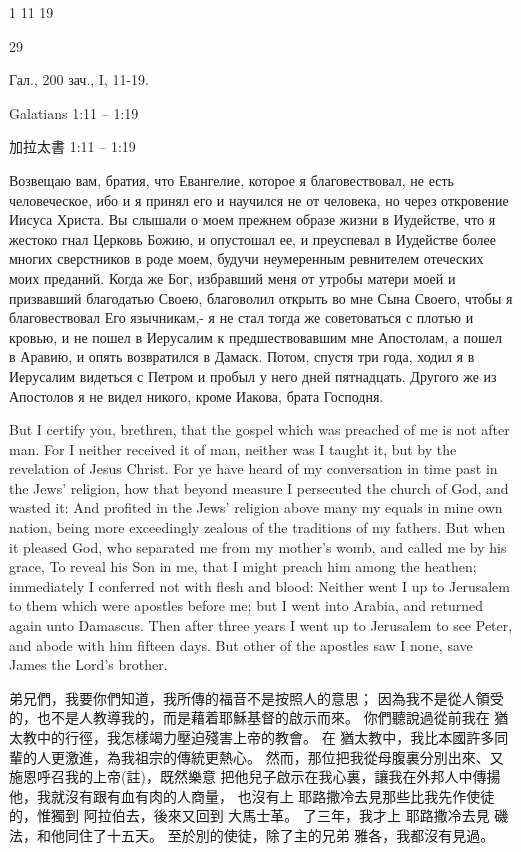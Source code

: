 1 11 19

29

\onehalfspacing %

\doublespacing %

\Large%

Гал., 200 зач., I, 11-19.

Galatians 1:11 -- 1:19

加拉太書 1:11 -- 1:19

Возвещаю вам, братия, что Евангелие, которое я благовествовал, не есть человеческое,
ибо и я принял его и научился не от человека, но через откровение Иисуса Христа.
Вы слышали о моем прежнем образе жизни в Иудействе, что я жестоко гнал Церковь Божию, и опустошал ее,
и преуспевал в Иудействе более многих сверстников в роде моем, будучи неумеренным ревнителем отеческих моих преданий.
Когда же Бог, избравший меня от утробы матери моей и призвавший благодатью Своею, благоволил
открыть во мне Сына Своего, чтобы я благовествовал Его язычникам,- я не стал тогда же советоваться с плотью и кровью,
и не пошел в Иерусалим к предшествовавшим мне Апостолам, а пошел в Аравию, и опять возвратился в Дамаск.
Потом, спустя три года, ходил я в Иерусалим видеться с Петром и пробыл у него дней пятнадцать.
Другого же из Апостолов я не видел никого, кроме Иакова, брата Господня. 

But I certify you, brethren, that the gospel which was preached of me is not after man.
For I neither received it of man, neither was I taught it, but by the revelation of Jesus Christ.
For ye have heard of my conversation in time past in the Jews' religion, how that beyond measure I persecuted the church of God, and wasted it:
And profited in the Jews' religion above many my equals in mine own nation, being more exceedingly zealous of the traditions of my fathers.
But when it pleased God, who separated me from my mother's womb, and called me by his grace,
To reveal his Son in me, that I might preach him among the heathen; immediately I conferred not with flesh and blood:
Neither went I up to Jerusalem to them which were apostles before me; but I went into Arabia, and returned again unto Damascus.
Then after three years I went up to Jerusalem to see Peter, and abode with him fifteen days.
But other of the apostles saw I none, save James the Lord's brother.

弟兄們，我要你們知道，我所傳的福音不是按照人的意思；
因為我不是從人領受的，也不是人教導我的，而是藉着耶穌基督的啟示而來。
你們聽說過從前我在 猶太教中的行徑，我怎樣竭力壓迫殘害上帝的教會。
在 猶太教中，我比本國許多同輩的人更激進，為我祖宗的傳統更熱心。
然而，那位把我從母腹裏分別出來、又施恩呼召我的上帝(註)，既然樂意
把他兒子啟示在我心裏，讓我在外邦人中傳揚他，我就沒有跟有血有肉的人商量，
也沒有上 耶路撒冷去見那些比我先作使徒的，惟獨到 阿拉伯去，後來又回到 大馬士革。
了三年，我才上 耶路撒冷去見 磯法，和他同住了十五天。
至於別的使徒，除了主的兄弟 雅各，我都沒有見過。 
